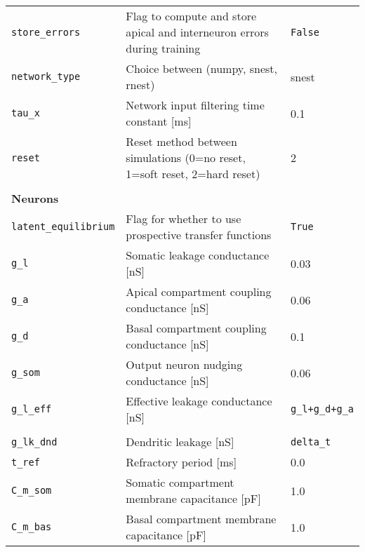 \begin{table}
\begin{center}
\begin{tabular}{p{}p{}p{}}
      \\
      \texttt{store\_errors}       & Flag to compute and store apical and interneuron errors during training     &
      \texttt{False}
      \\
      \texttt{network\_type}       & Choice between (numpy, snest, rnest)                                        & snest
      \\
      \texttt{tau\_x}              & Network input filtering time constant [ms]                                  & 0.1
      \\
      \texttt{reset}               & Reset method between simulations (0=no reset, 1=soft reset, 2=hard reset)   & 2     \\

      \\
      \textbf{Neurons}
      \\\hline
      \texttt{latent\_equilibrium} & Flag for whether to use prospective transfer functions                      &
      \texttt{True}
      \\
      \texttt{g\_l}                & Somatic leakage conductance [nS]                                            & 0.03
      \\
      \texttt{g\_a}                & Apical compartment coupling conductance [nS]                                & 0.06
      \\
      \texttt{g\_d}                & Basal compartment coupling conductance [nS]                                 & 0.1
      \\
      \texttt{g\_som}              & Output neuron nudging conductance [nS]                                      & 0.06
      \\
      \texttt{g\_l\_eff}           & Effective leakage conductance [nS]                                          &
      \texttt{g\_l+g\_d+g\_a}
      \\
      \\
      \texttt{g\_lk\_dnd}          & Dendritic leakage [nS]                                                      &
      \texttt{delta\_t}
      \\
      \texttt{t\_ref}              & Refractory period [ms]                                                      & 0.0
      \\
      \texttt{C\_m\_som}           & Somatic compartment membrane capacitance [pF]                               & 1.0
      \\
      \texttt{C\_m\_bas}           & Basal compartment membrane capacitance [pF]                                 & 1.0

\end{tabular}
\end{center}
\end{table}
